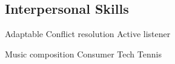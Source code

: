\documentclass{dske-resume-openfont}
\begin{document}
\begin{minipage}[t]{0.31\textwidth}
{{\fontsize{\the\leftSubsectionSize}{\the\leftSubsectionLineSpace}\selectfont\subsection{Interpersonal Skills}}
Adaptable \textbullet{} Conflict resolution \textbullet{} Active listener
}
\vspace{\leftSectionPadding}


{\fontsize{\the\rightColumnFont}{\the\rightColumnLineSpace}\selectfont
Music composition \textbullet{} Consumer Tech \textbullet{} Tennis
}


%
%

\end{minipage} 
\hspace{\rightColumnSpace}
\end{document}
